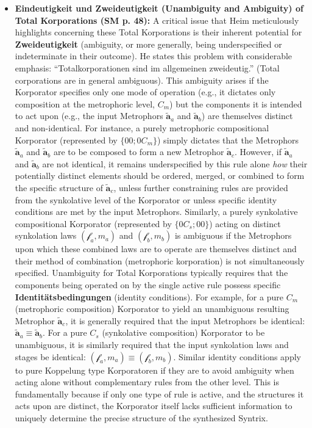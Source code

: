 \documentclass[12pt]{article}
\newcommand{\q}[1]{\enquote{#1}}
\newcommand{\metrophor}{\bm{\widetilde{a}}}
\newcommand{\synkolator}{\mathcal{f}}
\newcommand{\synkolationsstufe}{m}
\begin{document}
\begin{itemize}
    \begin{itemize}
        \item \textbf{Eindeutigkeit und Zweideutigkeit (Unambiguity and Ambiguity) of Total Korporations (SM p. 48):}
        A critical issue that Heim meticulously highlights concerning these Total Korporations is their inherent potential for \textbf{Zweideutigkeit} (ambiguity, or more generally, being underspecified or indeterminate in their outcome). He states this problem with considerable emphasis: \q{Totalkorporationen sind im allgemeinen zweideutig.} (Total corporations are in general ambiguous).
        This ambiguity arises if the Korporator specifies only one mode of operation (e.g., it dictates only composition at the metrophoric level, \(C_m\)) but the components it is intended to act upon (e.g., the input Metrophors \( \metrophor_a \) and \( \metrophor_b \)) are themselves distinct and non-identical. For instance, a purely metrophoric compositional Korporator (represented by \( \{0 0; 0 C_m\} \)) simply dictates that the Metrophors \( \metrophor_a \) and \( \metrophor_b \) are to be composed to form a new Metrophor \( \metrophor_c \). However, if \( \metrophor_a \) and \( \metrophor_b \) are not identical, it remains underspecified by this rule alone \textit{how} their potentially distinct elements should be ordered, merged, or combined to form the specific structure of \( \metrophor_c \), unless further constraining rules are provided from the synkolative level of the Korporator or unless specific identity conditions are met by the input Metrophors. Similarly, a purely synkolative compositional Korporator (represented by \( \{0 C_s; 0 0\} \)) acting on distinct synkolation laws \( (\synkolator_a, \synkolationsstufe_a) \) and \( (\synkolator_b, \synkolationsstufe_b) \) is ambiguous if the Metrophors upon which these combined laws are to operate are themselves distinct and their method of combination (metrophoric korporation) is not simultaneously specified.
        Unambiguity for Total Korporations typically requires that the components being operated on by the single active rule possess specific \textbf{Identitätsbedingungen} (identity conditions). For example, for a pure \( C_m \) (metrophoric composition) Korporator to yield an unambiguous resulting Metrophor \( \metrophor_c \), it is generally required that the input Metrophors be identical: \( \metrophor_a \equiv \metrophor_b \). For a pure \( C_s \) (synkolative composition) Korporator to be unambiguous, it is similarly required that the input synkolation laws and stages be identical: \( (\synkolator_a, \synkolationsstufe_a) \equiv (\synkolator_b, \synkolationsstufe_b) \). Similar identity conditions apply to pure Koppelung type Korporatoren if they are to avoid ambiguity when acting alone without complementary rules from the other level. This is fundamentally because if only one type of rule is active, and the structures it acts upon are distinct, the Korporator itself lacks sufficient information to uniquely determine the precise structure of the synthesized Syntrix.
    \end{itemize}


\end{itemize}
\end{document}
